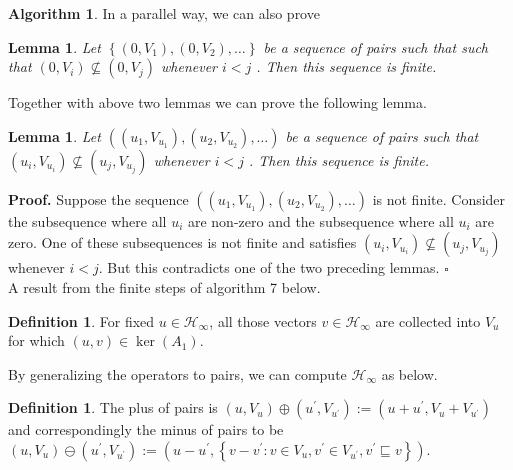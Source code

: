 \documentclass{article}
\theoremstyle{plain}
\newtheorem{lemma}[theorem]{Lemma}
\theoremstyle{definition}
\newtheorem{definition}[theorem]{Definition}
\newtheorem{algorithm}[theorem]{Algorithm}
\begin{document}
\begin{algorithm}
In a parallel way,  we can also prove 

\begin{lemma} Let $ \left\{\left(0, V_{1}\right),\left(0, V_{2}\right), \ldots\right\}$  be a sequence of pairs such that such that $ \left(0, V_{i}\right) \nsubseteq\left(0, V_{j}\right) $ whenever  $i<j$ . Then this sequence is finite. 
\end{lemma}

Together with above two lemmas we can prove the following lemma. 

\begin{lemma} Let  $\left(\left(u_{1}, V_{u_{1}}\right),\left(u_{2}, V_{u_{2}}\right), \ldots\right)$  be a sequence of pairs such that  $\left(u_{i}, V_{u_{i}}\right) \nsubseteq\left(u_{j}, V_{u_{j}}\right)$  whenever $ i<j$ . Then this sequence is finite.\end{lemma}

\noindent\textbf{Proof.} Suppose the sequence  $\left(\left(u_{1}, V_{u_{1}}\right),\left(u_{2}, V_{u_{2}}\right), \ldots\right)$  is not finite. Consider the subsequence where all  $u_{i}$  are non-zero and the subsequence where all  $u_{i}$  are zero. One of these subsequences is not finite and satisfies  $\left(u_{i}, V_{u_{i}}\right) \nsubseteq\left(u_{j}, V_{u_{j}}\right)$  whenever $ i<j$. But this contradicts one of the two preceding lemmas. \hfill$\square$\\

A result from the finite steps of algorithm 7 below.

\begin{definition} For fixed  $u \in \mathcal{H}_{\infty} $, all those vectors $ v \in \mathcal{H}_{\infty}$  are collected into  $V_{u}$  for which  $(u, v) \in   \operatorname{ker}\left(A_{1}\right)$. \end{definition}

By generalizing the operators to pairs, we can compute $\mathcal{H}_{\infty}$ as below.

\begin{definition} The plus of pairs is $\left(u, V_{u}\right) \oplus\left(u^{\prime}, V_{u^{\prime}}\right):=\left(u+u^{\prime}, V_{u}+V_{u^{\prime}}\right)$ and correspondingly the minus of pairs to be  $\left(u, V_{u}\right) \ominus\left(u^{\prime}, V_{u^{\prime}}\right):=\left(u-u^{\prime},\left\{v-v^{\prime}: v \in V_{u}, v^{\prime} \in V_{u^{\prime}}, v^{\prime} \sqsubseteq v\right\}\right)$.\end{definition}


\end{algorithm}
\end{document}
